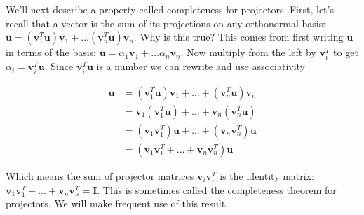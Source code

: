 \documentclass[main.tex]{subfiles}
\begin{document}
We'll next describe a property called completeness for projectors: First, let's recall that a vector is the sum of its projections on any orthonormal basis:
$\mathbf{u}=\left(\mathbf{v}_{1}^{T} \mathbf{u}\right) \mathbf{v}_{1}+\ldots\left(\mathbf{v}_{n}^{T} \mathbf{u}\right) \mathbf{v}_{n}$. Why is this true? This comes from first writing $\mathbf{u}$ in terms of the basis: $\mathbf{u}=\alpha_{1} \mathbf{v}_{1}+\ldots \alpha_{n} \mathbf{v}_{n}$. Now multiply from the left by $\mathbf{v}_{i}^{T}$ to get $\alpha_{i}=\mathbf{v}_{i}^{T} \mathbf{u}$. Since $\mathbf{v}_{i}^{T} \mathbf{u}$ is a number we can rewrite and use associativity

$$
\begin{aligned}
\mathbf{u} &=\left(\mathbf{v}_{1}^{T} \mathbf{u}\right) \mathbf{v}_{1}+\ldots+\left(\mathbf{v}_{n}^{T} \mathbf{u}\right) \mathbf{v}_{n} \\
&=\mathbf{v}_{1}\left(\mathbf{v}_{1}^{T} \mathbf{u}\right)+\ldots+\mathbf{v}_{n}\left(\mathbf{v}_{n}^{T} \mathbf{u}\right) \\
&=\left(\mathbf{v}_{1} \mathbf{v}_{1}^{T}\right) \mathbf{u}+\ldots+\left(\mathbf{v}_{n} \mathbf{v}_{n}^{T}\right) \mathbf{u} \\
&=\left(\mathbf{v}_{1} \mathbf{v}_{1}^{T}+\ldots+\mathbf{v}_{n} \mathbf{v}_{n}^{T}\right) \mathbf{u}
\end{aligned}
$$

Which means the sum of projector matrices $\mathbf{v}_{i} \mathbf{v}_{i}^{T}$ is the identity matrix: $\mathbf{v}_{1} \mathbf{v}_{1}^{T}+\ldots+\mathbf{v}_{n} \mathbf{v}_{n}^{T}=\mathbf{I}$. This is sometimes called the completeness theorem for projectors. We will make frequent use of this result.
\end{document}
